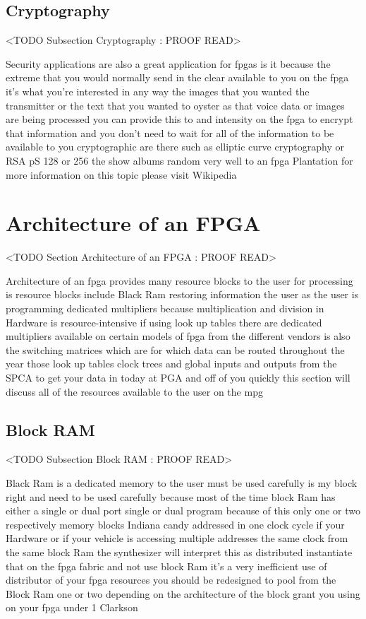 \subsection{Cryptography}
	<TODO Subsection Cryptography : PROOF READ>

Security applications are also a great application for fpgas is it because the extreme that you would normally send in the clear available to you on the fpga it's what you're interested in any way the images that you wanted the transmitter or the text that you wanted to oyster as that voice data or images are being processed you can provide this to and intensity on the fpga to encrypt that information and you don't need to wait for all of the information to be available to you cryptographic are there such as elliptic curve cryptography or RSA pS 128 or 256 the show albums random very well to an fpga Plantation for more information on this topic please visit Wikipedia

\section{Architecture of an FPGA}
	<TODO Section Architecture of an FPGA : PROOF READ>

Architecture of an fpga provides many resource blocks to the user for processing is resource blocks include Black Ram restoring information the user as the user is programming dedicated multipliers because multiplication and division in Hardware is resource-intensive if using look up tables there are dedicated multipliers available on certain models of fpga from the different vendors is also the switching matrices which are for which data can be routed throughout the year those look up tables clock trees and global inputs and outputs from the SPCA to get your data in today at PGA and off of you quickly this section will discuss all of the resources available to the user on the mpg

\subsection{Block RAM}
	<TODO Subsection Block RAM : PROOF READ>

Black Ram is a dedicated memory to the user must be used carefully is my block right and need to be used carefully because most of the time block Ram has either a single or dual port single or dual program because of this only one or two respectively memory blocks Indiana candy addressed in one clock cycle if your Hardware or if your vehicle is accessing multiple addresses the same clock from the same block Ram the synthesizer will interpret this as distributed instantiate that on the fpga fabric and not use block Ram it's a very inefficient use of distributor of your fpga resources you should be redesigned to pool from the Block Ram one or two depending on the architecture of the block grant you using on your fpga under 1 Clarkson

